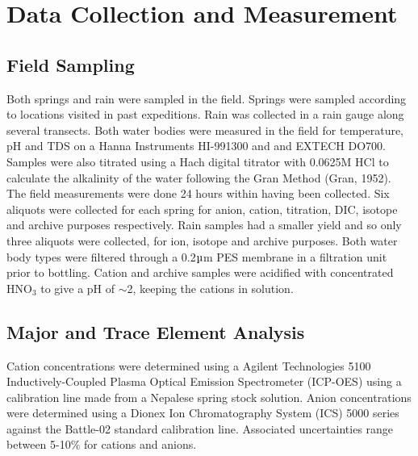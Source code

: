 
\newpage

\section{Data Collection and Measurement}


\subsection{Field Sampling}
Both springs and rain were sampled in the field. Springs were sampled according to locations visited in past expeditions. Rain was collected in a rain gauge along several transects. Both water bodies were measured in the field for temperature, pH and TDS on a Hanna Instruments HI-991300 and and EXTECH DO700. Samples were also titrated using a Hach digital titrator with 0.0625M HCl to calculate the alkalinity of the water following the Gran Method (Gran, 1952). The field measurements were done 24 hours within having been collected.  Six aliquots were collected for each spring for anion, cation, titration, DIC, isotope and archive purposes respectively.  Rain samples had a smaller yield and so only three aliquots were collected, for ion, isotope and archive purposes. Both water body types were filtered through a 0.2$\micro$m PES membrane in a filtration unit prior to bottling. Cation and archive samples were acidified with concentrated HNO$_3$ to give a pH of $\sim$2, keeping the cations in solution. 


\subsection{Major and Trace Element Analysis}

Cation concentrations were determined using a Agilent Technologies 5100 Inductively-Coupled Plasma Optical Emission Spectrometer (ICP-OES) using a calibration line made from a Nepalese spring stock solution. Anion concentrations were determined using a Dionex Ion Chromatography System (ICS) 5000 series against the Battle-02 standard calibration line. Associated uncertainties range between 5-10\% for cations and anions.



